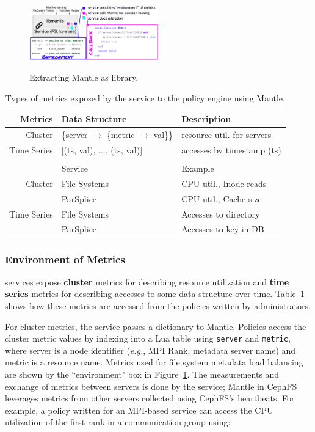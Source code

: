 \begin{figure}[t]
  \noindent\includegraphics[width=0.5\textwidth]{figures/mantle.png}\\

  \caption{Extracting Mantle as library.\label{fig:mantle}}

\end{figure}

\begin{table}
  \centering
  \begin{tabular}{ r | l | l }
  Metrics     & Data Structure & Description \\\hline
  Cluster     & \{server \(\rightarrow\) \{metric \(\rightarrow\) val\}\}
              & resource util. for servers \\
  Time Series & [(ts, val), ..., (ts, val)]
              & accesses by timestamp (ts) \\
  && \\
              & Service      & Example \\\hline
  Cluster     & File Systems & CPU util., Inode reads \\
              & ParSplice    & CPU util., Cache size \\
  Time Series & File Systems & Accesses to directory \\
              & ParSplice    & Accesses to key in DB\\
  \end{tabular}
  \caption{Types of metrics exposed by the service to the policy engine using Mantle.\label{table:metrics}}
\end{table}

\subsubsection{Environment of Metrics} services expose \textbf{cluster} metrics
for describing resource utilization and \textbf{time series} metrics for
describing accesses to some data structure over time. Table~\ref{table:metrics}
shows how these metrics are accessed from the policies written by
administrators. 

For cluster metrics, the service passes a dictionary to Mantle. Policies access
the cluster metric values by indexing into a Lua table using \texttt{server}
and \texttt{metric}, where server is a node identifier ({\it e.g.}, MPI Rank,
metadata server name) and metric is a resource name.  Metrics used for file
system metadata load balancing are shown by the ``environment" box in
Figure~\ref{fig:mantle}. The measurements and exchange of metrics between
servers is done by the service; Mantle in CephFS leverages metrics from other
servers collected using CephFS's heartbeats.  For example, a policy written for
an MPI-based service can access the CPU utilization of the first rank in a
communication group using:

